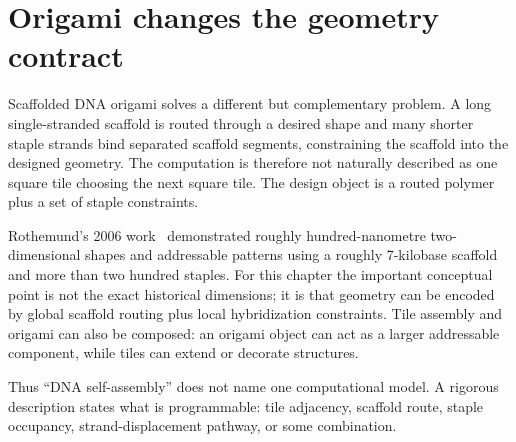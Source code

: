 \section{Origami changes the geometry contract}

Scaffolded DNA origami solves a different but complementary problem. A long
single-stranded scaffold is routed through a desired shape and many shorter
staple strands bind separated scaffold segments, constraining the scaffold into
the designed geometry. The computation is therefore not naturally described as
one square tile choosing the next square tile. The design object is a routed
polymer plus a set of staple constraints.



Rothemund's 2006 work~\cite{Rothemund2006} demonstrated roughly hundred-nanometre two-dimensional
shapes and addressable patterns using a roughly 7-kilobase scaffold and more
than two hundred staples. For this chapter the important conceptual point is
not the exact historical dimensions; it is that geometry can be encoded by
global scaffold routing plus local hybridization constraints. Tile assembly
and origami can also be composed: an origami object can act as a larger
addressable component, while tiles can extend or decorate structures.

Thus ``DNA self-assembly'' does not name one computational model. A rigorous
description states what is programmable: tile adjacency, scaffold route,
staple occupancy, strand-displacement pathway, or some combination.

